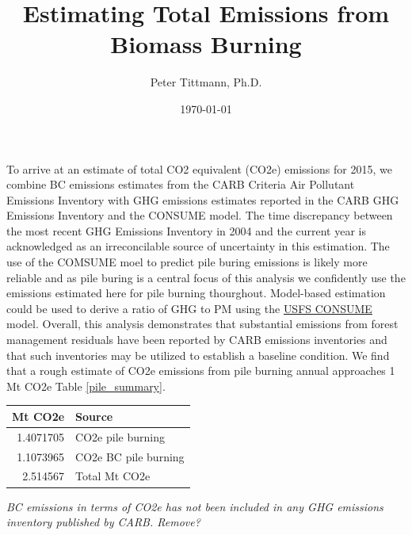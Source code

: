 \documentclass[a4paper]{article}
\author{Peter Tittmann, Ph.D.}
\date{\today}
\title{Estimating Total Emissions from Biomass Burning}
\begin{document}
\maketitle
\tableofcontents

To arrive at an estimate of total CO2 equivalent (CO2e) emissions for 2015, 
we combine \ac{BC} emissions estimates from the \ac{CARB}
Criteria Air Pollutant Emissions Inventory with GHG emissions estimates reported in the
CARB GHG Emissions Inventory and the CONSUME model. The time discrepancy between the most recent GHG Emissions Inventory in 2004 and the current year is
acknowledged as an irreconcilable source of uncertainty in this
estimation. The use of the COMSUME moel to predict pile buring emissions is likely more reliable and as pile buring is a central focus of this analysis we confidently use the emissions estimated here for pile burning thourghout. Model-based estimation could be used to derive a ratio of \ac{GHG} to PM using the \href{http://www.fs.fed.us/pnw/fera/research/smoke/consume/index.shtml}{USFS CONSUME} model. Overall, this analysis demonstrates that
substantial emissions from forest management residuals have been reported by CARB emissions inventories and that such inventories may be utilized to establish a baseline condition. We find that a rough estimate of CO2e emissions from pile
burning annual approaches 1 Mt CO2e Table \ref{pile_summary}.

\begin{center}
\begin{tabular}{rl}
Mt CO2e & Source\\
\hline
1.4071705 & CO2e pile burning\\
1.1073965 & CO2e BC pile burning\\
\hline
2.514567 & Total Mt CO2e\\
\end{tabular}
\end{center}
\emph{\emph{BC emissions in terms of CO2e has not been included in any \ac{GHG} emissions
inventory published by CARB. Remove?}}
\end{document}
